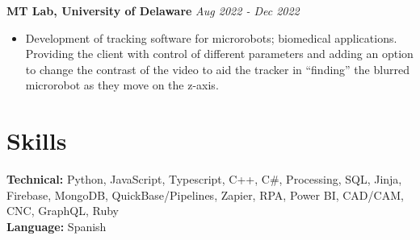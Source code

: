\documentclass[letterpaper,10pt]{article}
\newcommand{\simpleentry}[2]{%
  \vspace{2pt}
  \noindent\textbf{#1} \hfill \textit{#2}\par
  \vspace{-2pt}
}
\begin{document}
\simpleentry{MT Lab, University of Delaware}{Aug 2022 - Dec 2022}
      \begin{itemize}
        \item Development of tracking software for microrobots; biomedical applications. Providing the client with control of different parameters and adding an option to change the contrast of the video to aid the tracker in ``finding'' the blurred microrobot as they move on the z-axis.
      \end{itemize}

\section{Skills}

\textbf{Technical:} Python, JavaScript, Typescript, C++, C\#, Processing, SQL, Jinja, Firebase, MongoDB, QuickBase/Pipelines, Zapier, RPA, Power BI, CAD/CAM, CNC, GraphQL, Ruby \\[2pt]
\textbf{Language:} Spanish
\end{document}
